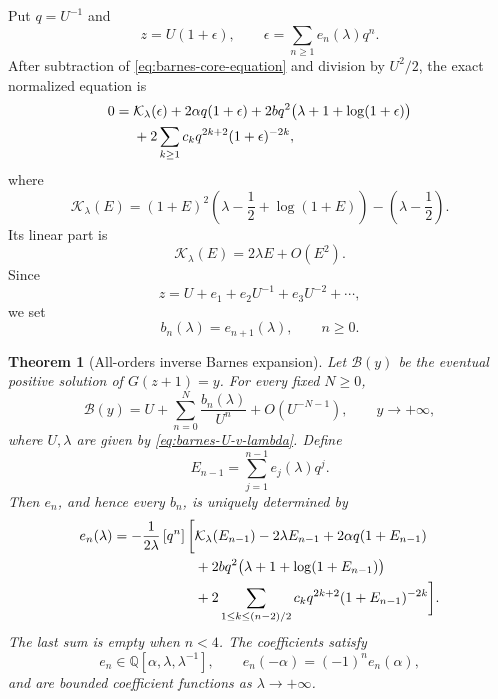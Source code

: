 \documentclass[11pt,oneside]{article}
\theoremstyle{plain}
\newtheorem{theorem}{Theorem}[section]
\theoremstyle{definition}
\theoremstyle{remark}
\newcommand{\Q}{\mathbb{Q}}
\newcommand{\Kcal}{\mathcal{K}}
\newcommand{\Bcal}{\mathcal{B}}
\newcommand{\coeff}[2]{\left[#1^{#2}\right]}
\begin{document}
Put \(q=U^{-1}\) and
\begin{equation}
 z=U(1+\epsilon),
 \qquad
 \epsilon=\sum_{n\ge1}e_n(\lambda)q^n.
 \label{eq:barnes-epsilon}
\end{equation}
After subtraction of \cref{eq:barnes-core-equation} and division by
\(U^2/2\), the exact normalized equation is
\begin{align}
 0={}&\Kcal_\lambda(\epsilon)
 +2\alpha q(1+\epsilon)
 +2bq^2\bigl(\lambda+1+\log(1+\epsilon)\bigr)
 \notag\\
 &+2\sum_{k\ge1}c_kq^{2k+2}(1+\epsilon)^{-2k},
 \label{eq:barnes-normalized}
\end{align}
where
\begin{equation}
 \Kcal_\lambda(E)
 =(1+E)^2\left(\lambda-\frac12+\log(1+E)\right)
 -\left(\lambda-\frac12\right).
 \label{eq:barnes-kernel}
\end{equation}
Its linear part is
\begin{equation}
 \Kcal_\lambda(E)=2\lambda E+O(E^2).
 \label{eq:barnes-kernel-linear}
\end{equation}
Since
\[
 z=U+e_1+e_2U^{-1}+e_3U^{-2}+\cdots,
\]
we set
\begin{equation}
 b_n(\lambda)=e_{n+1}(\lambda),
 \qquad n\ge0.
 \label{eq:barnes-b-e}
\end{equation}

\begin{theorem}[All-orders inverse Barnes expansion]
\label{thm:barnes-all-orders}
Let \(\Bcal(y)\) be the eventual positive solution of \(G(z+1)=y\).  For every
fixed \(N\ge0\),
\begin{equation}
 \Bcal(y)=U+\sum_{n=0}^{N}\frac{b_n(\lambda)}{U^n}
 +O(U^{-N-1}),
 \qquad y\to+\infty,
 \label{eq:barnes-all-orders}
\end{equation}
where \(U,\lambda\) are given by \cref{eq:barnes-U-v-lambda}.  Define
\begin{equation}
 E_{n-1}=\sum_{j=1}^{n-1}e_j(\lambda)q^j.
 \label{eq:barnes-E-trunc}
\end{equation}
Then \(e_n\), and hence every \(b_n\), is uniquely determined by
\begin{align}
 e_n(\lambda)=-\frac1{2\lambda}\coeff{q}{n}
 \biggl[{}&\Kcal_\lambda(E_{n-1})-2\lambda E_{n-1}
 +2\alpha q(1+E_{n-1})
 \notag\\
 &+2bq^2\bigl(\lambda+1+\log(1+E_{n-1})\bigr)
 \notag\\
 &+2\sum_{1\le k\le(n-2)/2}
 c_kq^{2k+2}(1+E_{n-1})^{-2k}
 \biggr].
 \label{eq:barnes-recurrence}
\end{align}
The last sum is empty when \(n<4\).  The coefficients satisfy
\begin{equation}
 e_n\in\Q[\alpha,\lambda,\lambda^{-1}],
 \qquad
 e_n(-\alpha)=(-1)^ne_n(\alpha),
 \label{eq:barnes-ring-parity}
\end{equation}
and are bounded coefficient functions as \(\lambda\to+\infty\).
\end{theorem}
\end{document}
